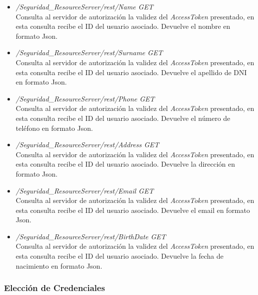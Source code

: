 \documentclass[a4,12pt,onecolum]{article}
\begin{document}
\begin{itemize}
\begin{itemize}
		\item \emph{/Seguridad\_ResourceServer/rest/Name	GET} \\
		Consulta al servidor de autorización la validez del \emph{AccessToken} presentado, en esta consulta 			recibe el ID del usuario asociado. Devuelve el nombre en formato Json.
		
		\item \emph{/Seguridad\_ResourceServer/rest/Surname	GET} \\
		Consulta al servidor de autorización la validez del \emph{AccessToken} presentado, en esta consulta 			recibe el ID del usuario asociado. Devuelve el apellido de DNI en formato Json.
		
		\item \emph{/Seguridad\_ResourceServer/rest/Phone	GET} \\
		Consulta al servidor de autorización la validez del \emph{AccessToken} presentado, en esta consulta 			recibe el ID del usuario asociado. Devuelve el número de teléfono en formato Json.
		
		\item \emph{/Seguridad\_ResourceServer/rest/Address	GET} \\
		Consulta al servidor de autorización la validez del \emph{AccessToken} presentado, en esta consulta 			recibe el ID del usuario asociado. Devuelve la dirección en formato Json.
		
		\item \emph{/Seguridad\_ResourceServer/rest/Email	GET} \\
		Consulta al servidor de autorización la validez del \emph{AccessToken} presentado, en esta consulta 			recibe el ID del usuario asociado. Devuelve el email en formato Json.
		
		\item \emph{/Seguridad\_ResourceServer/rest/BirthDate	GET} \\
		Consulta al servidor de autorización la validez del \emph{AccessToken} presentado, en esta consulta 			recibe el ID del usuario asociado. Devuelve la fecha de nacimiento en formato Json.
	\end{itemize}
\end{itemize}


\subsubsection{Elección de Credenciales}
\end{document}
